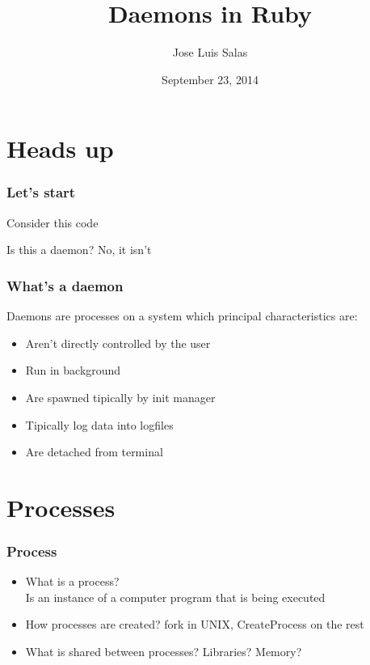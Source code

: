 \documentclass{beamer}
\title{Daemons in Ruby}
\author{Jose Luis Salas}
\date{September 23, 2014}
\begin{document}
\begin{frame}
  \titlepage
\end{frame}

\section{Heads up}

\begin{frame}[fragile]
  \frametitle{Let's start}

  Consider this code

  

  \pause Is this a daemon? \pause No, it isn't
\end{frame}


\begin{frame}
  \frametitle{What's a daemon}

  Daemons are processes on a system which principal characteristics are:

  \begin{itemize}
    \pause \item Aren't directly controlled by the user
    \pause \item Run in background
    \pause \item Are spawned tipically by init manager
    \pause \item Tipically log data into logfiles
    \pause \item Are detached from terminal
  \end{itemize}
\end{frame}

\section{Processes}

\begin{frame}
  \frametitle{Process}

  \begin{itemize}
    \pause \item What is a process? \pause \\ Is an instance of a computer program that is being executed
    \pause \item How processes are created? \pause fork in UNIX\pause, CreateProcess on the rest
    \pause \item What is shared between processes? \pause Libraries? \pause Memory?
  \end{itemize}
\end{frame}
\end{document}
